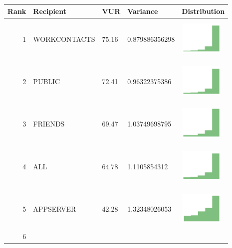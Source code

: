 \begin{table}[t]
\begin{center}
\small
\begin{tabular}{| r | p{1.5cm} | p{1cm} | p{1cm} | p{2cm} |}
\hline
Rank & Recipient & VUR & Variance & Distribution\\
\hline
1& WORKCONTACTS & 75.16 & 0.879886356298& \includegraphics[width = 2cm, height = 2cm]{tables/recipient_work}\\ 
2& PUBLIC & 72.41 & 0.96322375386& \includegraphics[width = 2cm, height = 2cm]{tables/recipient_pub}\\ 
3& FRIENDS & 69.47 & 1.03749698795 & \includegraphics[width = 2cm, height = 2cm]{tables/recipient_friends}\\ 
4& ALL & 64.78 & 1.1105854312& \includegraphics[width = 2cm, height = 2cm]{tables/recipient_total}\\ 
5& APPSERVER & 42.28 & 1.32348026053& \includegraphics[width = 2cm, height = 2cm]{tables/recipient_app}\\ 
6\hline
\end{tabular}
\end{center}
\end{table}